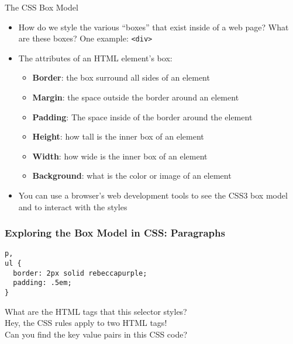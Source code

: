 \documentclass[14pt,aspectratio=169]{beamer}
\begin{document}
%
\begin{frame}{The CSS Box Model}
  \begin{itemize}
    \item How do we style the various ``boxes'' that exist inside of a web
      page? What are these boxes? One example: {\tt <div>}
      \vspace*{-.2in}
    \item The attributes of an HTML element's box:
      \begin{itemize}
        \item {\bf Border}: the box surround all sides of an element
        \item {\bf Margin}: the space outside the border around an element
        \item {\bf Padding}: The space inside of the border around the element
        \item {\bf Height}: how tall is the inner box of an element
        \item {\bf Width}: how wide is the inner box of an element
        \item {\bf Background}: what is the color or image of an element
      \end{itemize}
      \vspace*{-.2in}
    \item You can use a browser's web development tools to see the CSS3 box
      model and to interact with the styles
  \end{itemize}
\end{frame}

%
\begin{frame}[fragile]
  \frametitle{Exploring the Box Model in CSS: Paragraphs}
  \normalsize
  \hspace*{.25in}
  \begin{minipage}{6in}
    \vspace*{.2in}
    \begin{verbatim}
p,
ul {
  border: 2px solid rebeccapurple;
  padding: .5em;
}
    \end{verbatim}
  \end{minipage}
  \vspace*{.05in}
  \begin{center}
    \noindent What are the HTML tags that this selector styles? \\
    \noindent Hey, the CSS rules apply to two HTML tags! \\
    \noindent Can you find the key value pairs in this CSS code? \\
  \end{center}
\end{frame}
\end{document}

